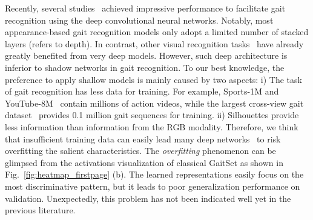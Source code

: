 \documentclass[runningheads]{llncs}
\begin{document}
    Recently, several studies~\cite{shiraga2016geinet,wu2016comprehensive,20163dcnn,2019_part_zhangyuqi,MT3D} achieved impressive performance to facilitate gait recognition using the deep convolutional neural networks. Notably, most appearance-based gait recognition models only adopt a limited number of stacked layers (refers to depth). In contrast, other visual recognition tasks~\cite{action,he2021masked} have already greatly benefited from very deep models. However, such deep architecture is inferior to shadow networks in gait recognition. To our best knowledge, the preference to apply shallow models is mainly caused by two aspects: i) The task of gait recognition has less data for training. For example, Sports-1M and YouTube-8M~\cite{sports1m,youtube} contain millions of action videos, while the largest cross-view gait dataset~\cite{oumvlp} provides 0.1 million gait sequences for training. ii) Silhouettes provide less information than information from the RGB modality. Therefore, we think that insufficient training data can easily lead many deep networks~\cite{aaai2019gaitset,gln,disentangled2019cvprgaitnet} to risk overfitting the salient characteristics. The \textit{overfitting} phenomenon can be glimpsed from the activations visualization of classical GaitSet\cite{aaai2019gaitset} as shown in Fig.~\ref{fig:heatmap_firstpage} (b). The learned representations easily focus on the most discriminative pattern, but it leads to poor generalization performance on validation. Unexpectedly, this problem has not been indicated well yet in the previous literature.
    
\end{document}
